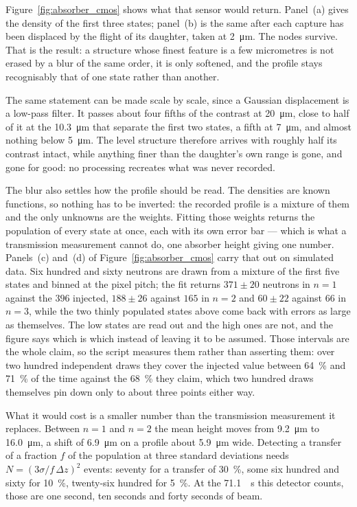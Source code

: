 \documentclass[a4paper,headsepline,oneside,11pt]{scrartcl}
\begin{document}
Figure~\ref{fig:absorber_cmos} shows what that sensor would return. Panel~(a)
gives the density of the first three states; panel~(b) is the same after each capture
has been displaced by the flight of its daughter, taken at
\SI{2}{\micro\metre}. The nodes survive. That is the result: a structure whose
finest feature is a few micrometres is not erased by a blur of the same order,
it is only softened, and the profile stays recognisably that of one state rather
than another.

The same statement can be made scale by scale, since a Gaussian displacement is
a low-pass filter. It passes about four fifths of the contrast at
\SI{20}{\micro\metre}, close to half of it at the \SI{10.3}{\micro\metre} that
separate the first two states, a fifth at \SI{7}{\micro\metre}, and almost
nothing below \SI{5}{\micro\metre}. The level structure therefore arrives with
roughly half its contrast intact, while anything finer than the daughter's own
range is gone, and gone for good: no processing recreates what was never
recorded.

The blur also settles how the profile should be read. The densities are known
functions, so nothing has to be inverted: the recorded profile is a mixture of
them and the only unknowns are the weights. Fitting those weights returns the
population of every state at once, each with its own error bar --- which is
what a transmission measurement cannot do, one absorber height giving one
number. Panels~(c) and~(d) of Figure~\ref{fig:absorber_cmos} carry that out on
simulated data. Six hundred and sixty neutrons are drawn from a mixture of the
first five states and binned at the pixel pitch; the fit returns $371 \pm 20$
neutrons in $n=1$ against the $396$ injected, $188 \pm 26$ against $165$ in
$n=2$ and $60 \pm 22$ against $66$ in $n=3$, while the two thinly populated
states above come back with errors as large as themselves. The low states are
read out and the high ones are not, and the figure says which is which instead
of leaving it to be assumed. Those intervals are the whole claim, so the script
measures them rather than asserting them: over two hundred independent draws
they cover the injected value between \SI{64}{\percent} and \SI{71}{\percent}
of the time against the \SI{68}{\percent} they claim, which two hundred draws
themselves pin down only to about three points either way.

What it would cost is a smaller number than the transmission measurement it
replaces. Between $n=1$ and $n=2$ the mean height moves from \SI{9.2}{\micro\metre}
to \SI{16.0}{\micro\metre}, a shift of \SI{6.9}{\micro\metre} on a profile
about \SI{5.9}{\micro\metre} wide. Detecting a transfer of a fraction $f$ of the
population at three standard deviations needs $N = (3\sigma / f\,\Delta z)^2$
events: seventy for a transfer of \SI{30}{\percent}, some six hundred and sixty
for \SI{10}{\percent}, twenty-six hundred for \SI{5}{\percent}. At the
\SI{71.1}{\per\second} this detector counts, those are one second, ten seconds
and forty seconds of beam.
\end{document}
